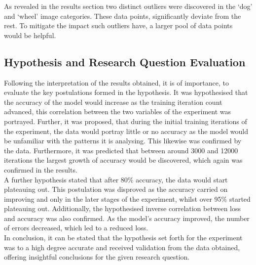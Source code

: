 As revealed in the results section two distinct outliers were discovered in the ‘dog’ and ‘wheel’ image categories. These data points, significantly deviate from the rest. To mitigate the impact such outliers have, a larger pool of data points would be helpful.  \\


\subsection{Hypothesis and Research Question Evaluation}
Following the interpretation of the results obtained, it is of importance, to evaluate the key postulations formed in the hypothesis. It was hypothesised that the accuracy of the model would increase as the training iteration count advanced, this correlation between the two variables of the experiment was portrayed. Further, it was proposed, that during the initial training iterations of the experiment, the data would portray little or no accuracy as the model would be unfamiliar with the patterns it is analysing. This likewise was confirmed by the data. Furthermore, it was predicted that between around 3000 and 12000 iterations the largest growth of accuracy would be discovered, which again was confirmed in the results. \\

A further hypothesis stated that after 80\% accuracy, the data would start plateauing out. This postulation was disproved as the accuracy carried on improving and only in the later stages of the experiment, whilst over 95\% started plateauing out.  Additionally, the hypothesised inverse correlation between loss and accuracy was also confirmed. As the model's accuracy improved, the number of errors decreased, which led to a reduced loss.\\ 

In conclusion, it can be stated that the hypothesis set forth for the experiment was to a high degree accurate and received validation from the data obtained, offering insightful conclusions for the given research question.
\\	


